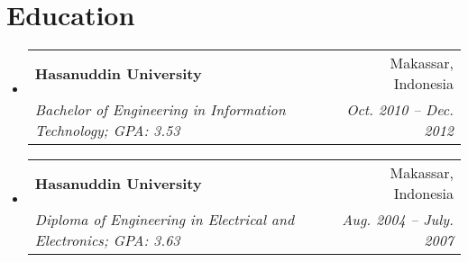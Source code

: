 \documentclass[letterpaper,11pt]{article}
\makeatletter
\newcommand{\resumeSubheading}[4]{
  \vspace{-1pt}\item
    \begin{tabular*}{0.97\textwidth}[t]{l@{\extracolsep{\fill}}r}
      \textbf{#1} & #2 \\
      \textit{\small#3} & \textit{\small #4} \\
    \end{tabular*}\vspace{-5pt}
}
\newcommand{\resumeSubHeadingListStart}{\begin{itemize}[leftmargin=*]}
\newcommand{\resumeSubHeadingListEnd}{\end{itemize}}
\makeatother
\begin{document}
\section{Education}
  \resumeSubHeadingListStart
    \resumeSubheading
      {Hasanuddin University}{Makassar, Indonesia}
      {Bachelor of Engineering in Information Technology;  GPA: 3.53}{Oct. 2010 -- Dec. 2012}
    \resumeSubheading
      {Hasanuddin University}{Makassar, Indonesia}
      {Diploma of Engineering in Electrical and Electronics;  GPA: 3.63}{Aug. 2004 -- July. 2007}
  \resumeSubHeadingListEnd

\end{document}
